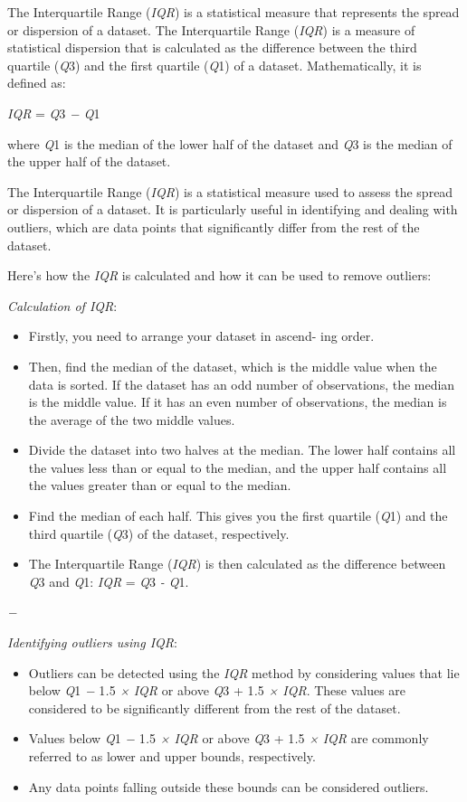 The Interquartile Range (\emph{IQR}) is a statistical measure that
represents the spread or dispersion of a dataset. The Interquartile
Range (\emph{IQR}) is a measure of statistical dispersion that is
calculated as the difference between the third quartile (\emph{Q}3) and
the first quartile (\emph{Q}1) of a dataset. Mathematically, it is
defined as:

\emph{IQR} = \emph{Q}3 \emph{− Q}1

where \emph{Q}1 is the median of the lower half of the dataset and
\emph{Q}3 is the median of the upper half of the dataset.

The Interquartile Range (\emph{IQR}) is a statistical measure used to
assess the spread or dispersion of a dataset. It is particularly useful
in identifying and dealing with outliers, which are data points that
significantly differ from the rest of the dataset.

Here's how the \emph{IQR} is calculated and how it can be used to remove
outliers:

\emph{Calculation of IQR}:

\begin{itemize}
\item
  Firstly, you need to arrange your dataset in ascend- ing order.
\item
  Then, find the median of the dataset, which is the middle value when
  the data is sorted. If the dataset has an odd number of observations,
  the median is the middle value. If it has an even number of
  observations, the median is the average of the two middle values.
\item
  Divide the dataset into two halves at the median. The lower half
  contains all the values less than or equal to the median, and the
  upper half contains all the values greater than or equal to the
  median.
\item
  Find the median of each half. This gives you the first quartile
  (\emph{Q}1) and the third quartile (\emph{Q}3) of the dataset,
  respectively.
\item
  The Interquartile Range (\emph{IQR}) is then calculated as the
  difference between \emph{Q}3 and \emph{Q}1: \emph{IQR} = \emph{Q}3
  \emph{- Q}1.
\end{itemize}

\emph{−}

\emph{Identifying outliers using IQR}:

\begin{itemize}
\item
  Outliers can be detected using the \emph{IQR} method by considering
  values that lie below \emph{Q}1 \emph{−} 1\emph{.}5 \emph{×}
  \emph{IQR} or above \emph{Q}3 + 1\emph{.}5 \emph{× IQR}. These values
  are considered to be significantly different from the rest of the
  dataset.
\item
  Values below \emph{Q}1 \emph{−} 1\emph{.}5 \emph{× IQR} or above
  \emph{Q}3 + 1\emph{.}5 \emph{×} \emph{IQR} are commonly referred to as
  lower and upper bounds, respectively.
\item
  Any data points falling outside these bounds can be considered
  outliers.
\end{itemize}

